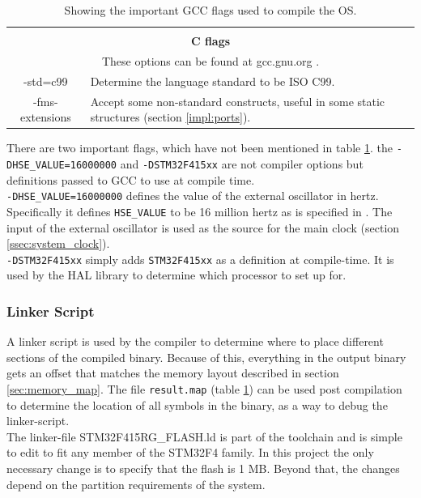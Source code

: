 \begin{table}[H]
\begin{tabular}{|c|p{10cm}|}
		\hline
		\multicolumn{2}{c}{} \\
		\multicolumn{2}{c}{\textbf{C flags}} \\
		\multicolumn{2}{c}{These options can be found at gcc.gnu.org \cite{gcc_c_dialects}.} \\
		\hline
		-std=c99 &
		Determine the language standard to be ISO C99. \\
		\hline
		-fms-extensions &
		Accept some non-standard constructs, useful in some static structures (section \ref{impl:ports}). \\
		\hline
	\end{tabular}
	\caption{Showing the important GCC flags used to compile the OS.}
	\label{tab:gcc_flags}
\end{table}

There are two important flags, which have not been mentioned in table \ref{tab:gcc_flags}.
the \texttt{-DHSE\_VALUE=16000000} and \texttt{-DSTM32F415xx} are not compiler options
but definitions passed to GCC to use at compile time.\\

\texttt{-DHSE\_VALUE=16000000} defines the value of the external oscillator in hertz.
Specifically it defines \texttt{HSE\_VALUE} to be 16 million hertz as is specified in \cite{hse_value}.
The input of the external oscillator is used as the source for the main clock (section \ref{ssec:system_clock}).\\

\texttt{-DSTM32F415xx} simply adds \texttt{STM32F415xx} as a definition at compile-time.
It is used by the HAL library to determine which processor to set up for.


\subsubsection{Linker Script}
\label{ssec:linker_script}
A linker script is used by the compiler to determine where to place different sections of the compiled binary.
Because of this, everything in the output binary gets an offset that matches the memory layout described in section \ref{sec:memory_map}.
The file \texttt{result.map} (table \ref{tab:gcc_flags}) can be used post compilation to determine the location of all symbols in the binary,
as a way to debug the linker-script.\\

The linker-file STM32F415RG\_FLASH.ld is part of the toolchain and is simple to edit to fit any member of the STM32F4 family.
In this project the only necessary change is to specify that the flash is 1 MB.
Beyond that, the changes depend on the partition requirements of the system.\\

